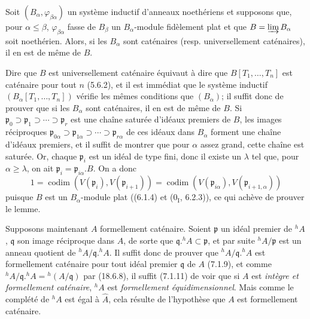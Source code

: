 \begin{lemma}[18.7.5.1]
\label{IV.18.7.5.1}
Soit $(B_\alpha,\varphi_{\beta\alpha})$ un système inductif d'anneaux noethériens et supposons que, pour $\alpha\leq\beta$, $\varphi_{\beta\alpha}$ fasse de $B_\beta$ un $B_\alpha$-module fidèlement plat et que $B=\varinjlim B_\alpha$ soit noethérien. Alors, si les $B_\alpha$ sont caténaires (resp. universellement caténaires), il en est de même de $B$.
\end{lemma}

Dire que $B$ est universellement caténaire équivaut à dire que $B[T_1,\ldots,T_n]$ est caténaire pour tout $n$ (5.6.2), et il est immédiat que le système inductif $(B_\alpha[T_1,\ldots,T_n])$ vérifie les mêmes conditions que $(B_\alpha)$; il suffit donc de prouver que si les $B_\alpha$ sont caténaires, il en est de même de $B$. Si $\mathfrak p_0\supset\mathfrak p_1\supset\cdots\supset\mathfrak p_r$ est une chaîne saturée d'idéaux premiers de $B$, les images réciproques $\mathfrak p_{0\alpha}\supset\mathfrak p_{1\alpha}\supset\cdots\supset\mathfrak p_{r\alpha}$ de ces idéaux dans $B_\alpha$ forment une chaîne d'idéaux premiers, et il suffit de montrer que pour $\alpha$ assez grand, cette chaîne est saturée. Or, chaque $\mathfrak p_i$ est un idéal de type fini, donc il existe un $\lambda$ tel que, pour $\alpha\geq\lambda$, on ait $\mathfrak p_i=\mathfrak p_{i\alpha}.B$. On a donc
\[
1=\operatorname{codim}(V(\mathfrak p_i),V(\mathfrak p_{i+1}))
=\operatorname{codim}(V(\mathfrak p_{i\alpha}),V(\mathfrak p_{i+1,\alpha}))
\]
puisque $B$ est un $B_\alpha$-module plat ((6.1.4) et ($0_{\mathrm I}$, 6.2.3)), ce qui achève de prouver le lemme.

Supposons maintenant $A$ formellement caténaire. Soient $\mathfrak p$ un idéal premier de ${}^h\!A$, $\mathfrak q$ son image réciproque dans $A$, de sorte que $\mathfrak q.{}^h\!A\subset\mathfrak p$, et par suite ${}^h\!A/\mathfrak p$ est un anneau quotient de ${}^h\!A/\mathfrak q.{}^h\!A$. Il suffit donc de prouver que ${}^h\!A/\mathfrak q.{}^h\!A$ est formellement caténaire pour tout idéal premier $\mathfrak q$ de $A$ (7.1.9), et comme ${}^h\!A/\mathfrak q.{}^h\!A={}^h(A/\mathfrak q)$ par (18.6.8), il suffit (7.1.11) de voir que si $A$ est \emph{intègre et formellement caténaire}, ${}^h\!A$ est \emph{formellement équidimensionnel}. Mais comme le complété de ${}^h\!A$ est égal à $\widehat A$, cela résulte de l'hypothèse que $A$ est formellement caténaire.

